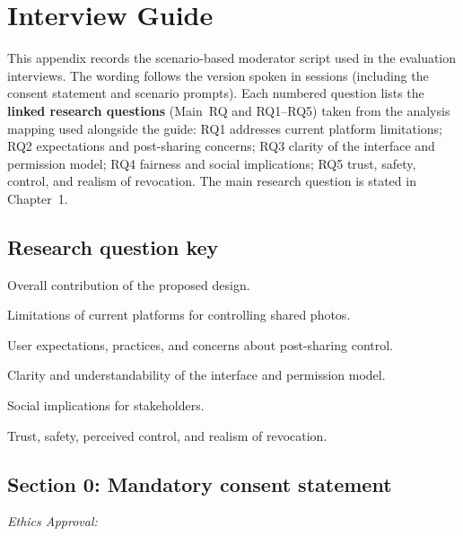 \chapter{Interview Guide}
\label{app:interview-guide}

This appendix records the scenario-based moderator script used in the evaluation interviews. The wording follows the version spoken in sessions (including the consent statement and scenario prompts). Each numbered question lists the \textbf{linked research questions} (Main~RQ and RQ1--RQ5) taken from the analysis mapping used alongside the guide: RQ1 addresses current platform limitations; RQ2 expectations and post-sharing concerns; RQ3 clarity of the interface and permission model; RQ4 fairness and social implications; RQ5 trust, safety, control, and realism of revocation. The main research question is stated in Chapter~1.

\section*{Research question key}
\begin{description}[style=nextline,leftmargin=0.8cm]
  \item[Main~RQ] Overall contribution of the proposed design.
  \item[RQ1] Limitations of current platforms for controlling shared photos.
  \item[RQ2] User expectations, practices, and concerns about post-sharing control.
  \item[RQ3] Clarity and understandability of the interface and permission model.
  \item[RQ4] Social implications for stakeholders.
  \item[RQ5] Trust, safety, perceived control, and realism of revocation.
\end{description}

\section{Section 0: Mandatory consent statement}
\textit{Ethics Approval:}


